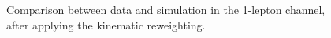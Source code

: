 \begin{figure}[htbp]
{\label{fig:strong:datamc1L:mT}}
\caption{Comparison between data and simulation in the 1-lepton channel, after applying the kinematic reweighting.
}
\label{fig:strong:datamc1L_a}
\end{figure}

